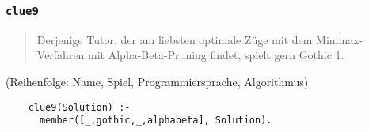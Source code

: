 \documentclass{beamer}
\begin{document}
\begin{frame}[fragile]
  \prolog
  \frametitle{\lstinline{clue9}}
  \begin{quote}
    Derjenige Tutor, der am liebsten optimale Züge mit dem Minimax-Verfahren mit Alpha-Beta-Pruning findet, spielt gern Gothic 1.
  \end{quote}
  \small{(Reihenfolge: Name, Spiel, Programmiersprache, Algorithmus)}
  \pause
  \begin{lstlisting}
    clue9(Solution) :-
      member([_,gothic,_,alphabeta], Solution).
  \end{lstlisting}
\end{frame}
\end{document}
